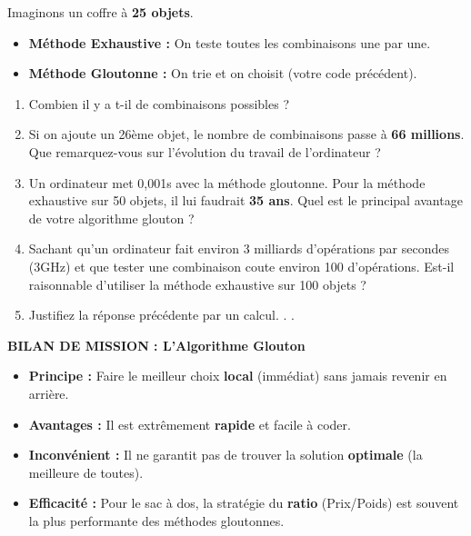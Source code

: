 \begin{Exercise}[title={Le défi du coffre géant : Vitesse vs Précision }]
Imaginons un coffre à \textbf{25 objets}.
\begin{itemize}
    \item \textbf{Méthode Exhaustive :} On teste toutes les combinaisons une par une.
    \item \textbf{Méthode Gloutonne :} On trie et on choisit (votre code précédent).
\end{itemize}

\begin{enumerate}
    \item Combien il y a t-il de combinaisons possibles ?
    \dotfill
    \item Si on ajoute un 26ème objet, le nombre de combinaisons passe à \textbf{66 millions}. Que remarquez-vous sur l'évolution du travail de l'ordinateur ? \dotfill
    \item  Un ordinateur met 0,001s avec la méthode gloutonne. Pour la méthode exhaustive sur 50 objets, il lui faudrait \textbf{35 ans}. 
    Quel est le principal avantage de votre algorithme glouton ? \dotfill
    \item Sachant qu'un ordinateur fait environ 3 milliards d'opérations par secondes (3GHz) et que tester une combinaison coute environ 100 d'opérations. Est-il raisonnable d'utiliser la méthode exhaustive sur 100 objets ?\dotfill
    \item Justifiez la réponse précédente par un calcul.
    .\dotfill
    .\dotfill
\end{enumerate}
\end{Exercise}

\begin{Comprendre}
 \textbf{BILAN DE MISSION : L'Algorithme Glouton}
\begin{itemize}
    \item \textbf{Principe :} Faire le meilleur choix \textbf{local} (immédiat) sans jamais revenir en arrière.
    \item \textbf{Avantages :} Il est extrêmement \textbf{rapide} et facile à coder.
    \item \textbf{Inconvénient :} Il ne garantit pas de trouver la solution \textbf{optimale} (la meilleure de toutes).
    \item \textbf{Efficacité :} Pour le sac à dos, la stratégie du \textbf{ratio} (Prix/Poids) est souvent la plus performante des méthodes gloutonnes.
\end{itemize}
\end{Comprendre}


